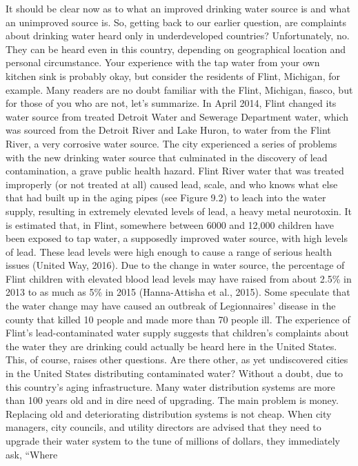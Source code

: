 \documentclass{article}
\begin{document}
It should be clear now as to what an improved drinking water source is
and what an unimproved source is. So, getting back to our earlier
question, are complaints about drinking water heard only in
underdeveloped countries? Unfortunately, no. They can be heard even in
this country, depending on geographical location and personal
circumstance. Your experience with the tap water from your own kitchen
sink is probably okay, but consider the residents of Flint, Michigan,
for example. Many readers are no doubt familiar with the Flint,
Michigan, fiasco, but for those of you who are not, let's summarize. In
April 2014, Flint changed its water source from treated Detroit Water
and Sewerage Department water, which was sourced from the Detroit River
and Lake Huron, to water from the Flint River, a very corrosive water
source. The city experienced a series of problems with the new drinking
water source that culminated in the discovery of lead contamination, a
grave public health hazard. Flint River water that was treated
improperly (or not treated at all) caused lead, scale, and who knows
what else that had built up in the aging pipes (see Figure 9.2) to leach
into the water supply, resulting in extremely elevated levels of lead, a
heavy metal neurotoxin. It is estimated that, in Flint, somewhere
between 6000 and 12,000 children have been exposed to tap water, a
supposedly improved water source, with high levels of lead. These lead
levels were high enough to cause a range of serious health issues
(United Way, 2016). Due to the change in water source, the percentage of
Flint children with elevated blood lead levels may have raised from
about 2.5\% in 2013 to as much as 5\% in 2015 (Hanna-Attisha et al.,
2015). Some speculate that the water change may have caused an outbreak
of Legionnaires' disease in the county that killed 10 people and made
more than 70 people ill. The experience of Flint's lead-contaminated
water supply suggests that children's complaints about the water they
are drinking could actually be heard here in the United States. This, of
course, raises other questions. Are there other, as yet undiscovered
cities in the United States distributing contaminated water? Without a
doubt, due to this country's aging infrastructure. Many water
distribution systems are more than 100 years old and in dire need of
upgrading. The main problem is money. Replacing old and deteriorating
distribution systems is not cheap. When city managers, city councils,
and utility directors are advised that they need to upgrade their water
system to the tune of millions of dollars, they immediately ask, ``Where
\end{document}

